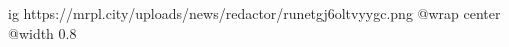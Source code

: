  
 
 
 
 

\ifcmt
  ig https://mrpl.city/uploads/news/redactor/runetgj6oltvyygc.png
  @wrap center
  @width 0.8
\fi
